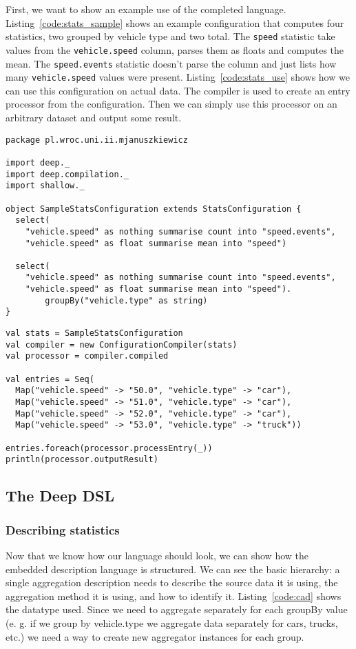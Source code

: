 First, we want to show an example use of the completed language. Listing~\ref{code:stats_sample} shows an example configuration that computes four statistics, two grouped by vehicle type and two total. The \texttt{speed} statistic take values from the \texttt{vehicle.speed} column, parses them as floats and computes the mean. The \texttt{speed.events} statistic doesn't parse the column and just lists how many \texttt{vehicle.speed} values were present. Listing~\ref{code:stats_use} shows how we can use this configuration on actual data. The compiler is used to create an entry processor from the configuration. Then we can simply use this processor on an arbitrary dataset and output some result.

\begin{lstlisting}[caption=Defined statistics, label=code:stats_sample]
package pl.wroc.uni.ii.mjanuszkiewicz

import deep._
import deep.compilation._
import shallow._

object SampleStatsConfiguration extends StatsConfiguration {
  select(
    "vehicle.speed" as nothing summarise count into "speed.events",
    "vehicle.speed" as float summarise mean into "speed")

  select(
    "vehicle.speed" as nothing summarise count into "speed.events",
    "vehicle.speed" as float summarise mean into "speed").
		groupBy("vehicle.type" as string)
}
\end{lstlisting}

\begin{lstlisting}[caption=Using statistics, label=code:stats_use]
val stats = SampleStatsConfiguration
val compiler = new ConfigurationCompiler(stats)
val processor = compiler.compiled

val entries = Seq(
  Map("vehicle.speed" -> "50.0", "vehicle.type" -> "car"),
  Map("vehicle.speed" -> "51.0", "vehicle.type" -> "car"),
  Map("vehicle.speed" -> "52.0", "vehicle.type" -> "car"),
  Map("vehicle.speed" -> "53.0", "vehicle.type" -> "truck"))

entries.foreach(processor.processEntry(_))
println(processor.outputResult)
\end{lstlisting}

\subsection{The Deep DSL}

\subsubsection{Describing statistics}
Now that we know how our language should look, we can show how the embedded description language is structured. We can see the basic hierarchy: a single aggregation description needs to describe the source data it is using, the aggregation method it is using, and how to identify it. Listing~\ref{code:cad} shows the datatype used. Since we need to aggregate separately for each groupBy value (e. g. if we group by vehicle.type we aggregate data separately for cars, trucks, etc.) we need a way to create new aggregator instances for each group.


